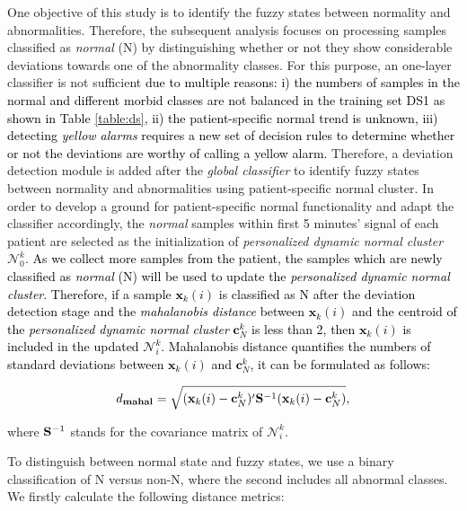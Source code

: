 One objective of this study is to identify the fuzzy states between normality and abnormalities. Therefore, the subsequent analysis focuses on processing samples classified as \textit{normal} (N) 
by distinguishing whether or not they show considerable deviations towards one of the abnormality classes. For this purpose, an one-layer classifier is not sufficient \textcolor{black}{due to multiple reasons: i) the numbers of samples in the normal and different morbid classes are not balanced in the training set DS1 as shown in Table \ref{table:ds}, ii) the patient-specific normal trend is unknown, iii) detecting \textit{yellow alarms} requires a new set of decision rules to determine whether or not the deviations are worthy of calling a yellow alarm.} Therefore, a deviation detection module is added after the \textit{global classifier} to identify fuzzy states between normality and abnormalities using patient-specific normal cluster. In order to develop a ground for patient-specific normal functionality and adapt the classifier accordingly, the \textit{normal} samples within first 5 minutes' signal of each patient are selected as the initialization of \textit{personalized dynamic normal cluster} $\mathcal{N}_0^k$. \textcolor{black}{As we collect more samples from the patient, the samples which are newly classified as \textit{normal} (N) will be used to update the \textit{personalized dynamic normal cluster}. Therefore, if a sample $\mathbf{x}_k(i)$ is classified as N after the deviation detection stage and the \textit{mahalanobis distance} between $\mathbf{x}_k(i)$ and the centroid of the \textit{personalized dynamic normal cluster} $\mathbf{c}^k_N$ is less than 2, then $\mathbf{x}_k(i)$ is included in the updated $\mathcal{N}_i^k$. Mahalanobis distance quantifies the numbers of standard deviations between $\mathbf{x}_k(i)$ and $\mathbf{c}^k_N$, it can be formulated as follows:}

\begin{align}
d_{\mathbf{mahal}} = \sqrt{ (\mathbf{x}_k(i)- \mathbf{c}^k_N)' {\rm \bf S}^{-1} (\mathbf{x}_k(i) - \mathbf{c}^k_N) },
\end{align}

where ${\rm \bf S}^{-1}$ stands for the covariance matrix of $\mathcal{N}_i^k$.


To distinguish between normal state and fuzzy states, we use a binary classification of N versus non-N, where the second includes all abnormal classes. We firstly calculate the following distance metrics:

